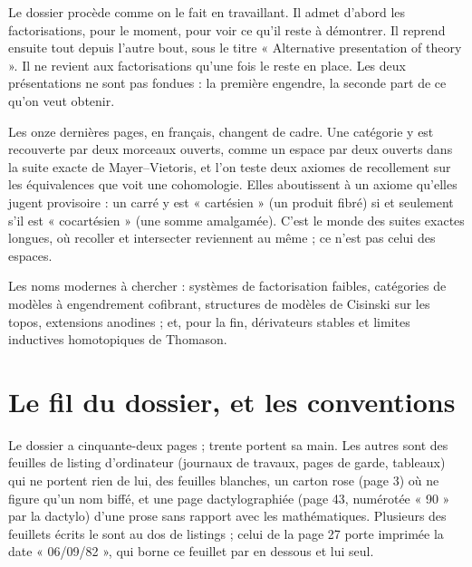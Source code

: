\documentclass[11pt,a4paper]{article}
\begin{document}
\begin{resume}
Le dossier procède comme on le fait en travaillant. Il admet d'abord les
factorisations, pour le moment, pour voir ce qu'il reste à démontrer. Il
reprend ensuite tout depuis l'autre bout, sous le titre « Alternative
presentation of theory ». Il ne revient aux factorisations qu'une fois le reste
en place. Les deux présentations ne sont pas fondues : la première engendre,
la seconde part de ce qu'on veut obtenir.

Les onze dernières pages, en français, changent de cadre. Une catégorie y est
recouverte par deux morceaux ouverts, comme un espace par deux ouverts dans la
suite exacte de Mayer--Vietoris, et l'on teste deux axiomes de recollement sur
les équivalences que voit une cohomologie. Elles aboutissent à un axiome
qu'elles jugent provisoire : un carré y est « cartésien » (un produit fibré)
si et seulement s'il est « cocartésien » (une somme amalgamée). C'est le monde
des suites exactes longues, où recoller et intersecter reviennent au même ; ce
n'est pas celui des espaces.

Les noms modernes à chercher : systèmes de factorisation faibles, catégories de
modèles à engendrement cofibrant, structures de modèles de Cisinski sur les
topos, extensions anodines ; et, pour la fin, dérivateurs stables et limites
inductives homotopiques de Thomason.

\end{resume}

\section*{Le fil du dossier, et les conventions}

Le dossier a cinquante-deux pages ; trente portent sa main. Les autres sont des
feuilles de listing d'ordinateur (journaux de travaux, pages de garde,
tableaux) qui ne portent rien de lui, des feuilles blanches, un carton rose
(page 3) où ne figure qu'un nom biffé, et une page dactylographiée (page 43,
numérotée « 90 » par la dactylo) d'une prose sans rapport avec les
mathématiques. Plusieurs des feuillets écrits le sont au dos de listings ; celui
de la page 27 porte imprimée la date « 06/09/82 », qui borne ce feuillet par
en dessous et lui seul.
\end{document}
